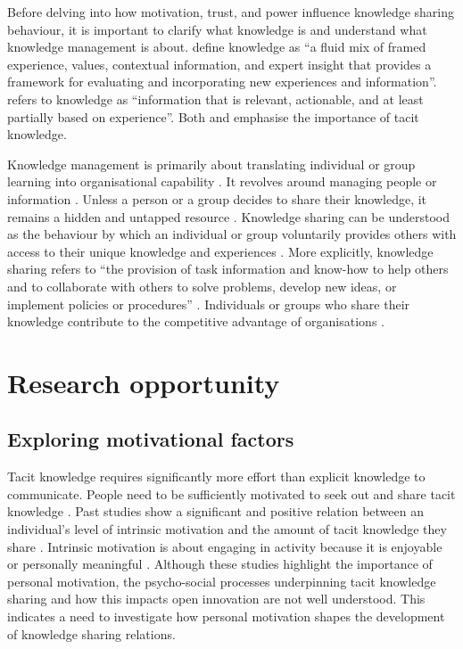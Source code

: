 Before delving into how motivation, trust, and power influence knowledge sharing behaviour, it is important to clarify what knowledge is and understand what knowledge management is about. \citet{davenport1998working} define knowledge as \enquote{a fluid mix of framed experience, values, contextual information, and expert insight that provides a framework for evaluating and incorporating new experiences and information}. \citet{leonard1998role} refers to knowledge as \enquote{information that is relevant, actionable, and at least partially based on experience}. Both \citet{davenport1998working} and \citet{leonard1998role} emphasise the importance of tacit knowledge. \medskip

Knowledge management is primarily about translating individual or group learning into organisational capability \citep{mcdermott1999information,hansen2005share,lam2010knowledge,girard2015defining}. It revolves around managing people or information \citep{alvesson2001odd}. Unless a person or a group decides to share their knowledge, it remains a hidden and untapped resource \citep{davenport1998working}. Knowledge sharing can be understood as the behaviour by which an individual or group voluntarily provides others with access to their unique knowledge and experiences \citep{cabrera2002knowledge,hansen2005share}. More explicitly, knowledge sharing refers to \enquote{the provision of task information and know-how to help others and to collaborate with others to solve problems, develop new ideas, or implement policies or procedures} \citep{wang2010knowledge}.
Individuals or groups who share their knowledge contribute to the competitive advantage of organisations \citep{papadopoulos2013exploring}. \medskip

\section{Research opportunity}

\subsection{Exploring motivational factors}

Tacit knowledge requires significantly more effort than explicit knowledge to communicate. People need to be sufficiently motivated to seek out and share tacit knowledge \citep{leonard1998role}. Past studies show a significant and positive relation between an individual's level of intrinsic motivation and the amount of tacit knowledge they share  \citep[e.g.][]{osterloh2000motivation,kaser2001knowledge,smith2001role}. Intrinsic motivation is about engaging in activity because it is enjoyable or personally meaningful \citep{ryan2000intrinsic}. Although these studies highlight the importance of personal motivation, the psycho-social processes underpinning tacit knowledge sharing and how this impacts open innovation are not well understood. This indicates a need to investigate how personal motivation shapes the development of knowledge sharing relations. \medskip

